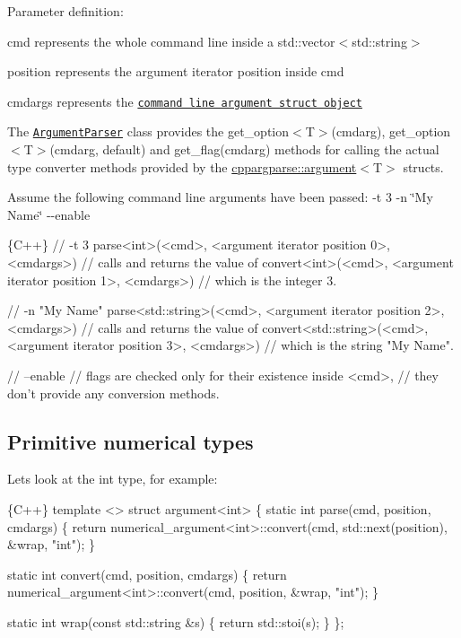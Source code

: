 Parameter definition\+:
\begin{DoxyItemize}
\item {\ttfamily cmd} represents the whole command line inside a {\ttfamily std\+::vector$<$std\+::string$>$}
\item {\ttfamily position} represents the argument iterator position inside {\ttfamily cmd}
\item {\ttfamily cmdargs} represents the \href{https://github.com/backraw/cppargparse/blob/master/include/cppargparse/types.h#L41}{\tt command line argument struct object}
\end{DoxyItemize}

The \href{https://github.com/backraw/cppargparse/blob/master/include/cppargparse/parser.h#L242}{\tt Argument\+Parser} class provides the {\ttfamily get\+\_\+option$<$T$>$(cmdarg)}, {\ttfamily get\+\_\+option$<$T$>$(cmdarg, default)} and {\ttfamily get\+\_\+flag(cmdarg)} methods for calling the actual type converter methods provided by the {\ttfamily \hyperlink{structcppargparse_1_1argument}{cppargparse\+::argument}$<$T$>$} structs.

Assume the following command line arguments have been passed\+: {\ttfamily -\/t 3 -\/n \char`\"{}\+My Name\char`\"{} -\/-\/enable} 
\begin{DoxyCode}
\{C++\}
// -t 3
parse<int>(<cmd>, <argument iterator position 0>, <cmdargs>)
// calls and returns the value of
convert<int>(<cmd>, <argument iterator position 1>, <cmdargs>)
// which is the integer 3.


// -n "My Name"
parse<std::string>(<cmd>, <argument iterator position 2>, <cmdargs>)
// calls and returns the value of
convert<std::string>(<cmd>, <argument iterator position 3>, <cmdargs>)
// which is the string "My Name".


// --enable
// flags are checked only for their existence inside <cmd>,
// they don't provide any conversion methods.
\end{DoxyCode}


\subsection*{Primitive numerical types}

Let\textquotesingle{}s look at the {\ttfamily int} type, for example\+: 
\begin{DoxyCode}
\{C++\}
template <>
struct argument<int>
\{
    static int parse(cmd, position, cmdargs)
    \{
        return numerical\_argument<int>::convert(cmd, std::next(position), &wrap, "int");
    \}

    static int convert(cmd, position, cmdargs)
    \{
        return numerical\_argument<int>::convert(cmd, position, &wrap, "int");
    \}

    static int wrap(const std::string &s)
    \{
        return std::stoi(s);
    \}
\};
\end{DoxyCode}



